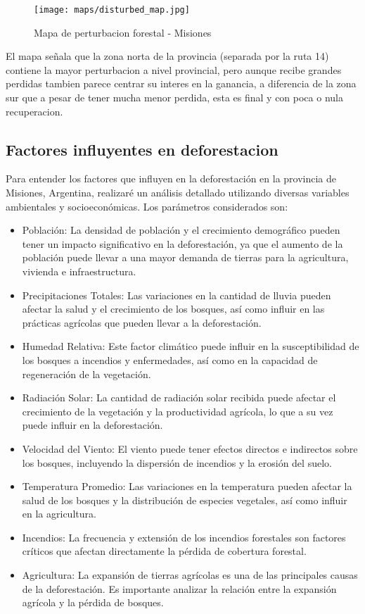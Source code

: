 \documentclass[11pt]{article}
\begin{document}
\begin{figure}[H]
    \centering
        \centering
        \texttt{[image: maps/disturbed\_map.jpg]}
        \caption{Mapa de perturbacion forestal - Misiones}
        \label{fig:smog_rating_año}
\end{figure}

El mapa señala que la zona norta de la provincia (separada por la ruta 14) contiene la mayor perturbacion a nivel provincial, pero aunque recibe grandes perdidas tambien parece centrar su interes en la ganancia, a diferencia de la zona sur que a pesar de tener mucha menor perdida, esta es final y con poca o nula recuperacion.


\subsection{Factores influyentes en deforestacion } \label{tab: Analisis 2}
Para entender los factores que influyen en la deforestación en la provincia de Misiones, Argentina, realizaré un análisis detallado utilizando diversas variables ambientales y socioeconómicas. Los parámetros considerados son:

    \begin{itemize}
        \item Población: La densidad de población y el crecimiento demográfico pueden tener un impacto significativo en la deforestación, ya que el aumento de la población puede llevar a una mayor demanda de tierras para la agricultura, vivienda e infraestructura.
        \item Precipitaciones Totales: Las variaciones en la cantidad de lluvia pueden afectar la salud y el crecimiento de los bosques, así como influir en las prácticas agrícolas que pueden llevar a la deforestación.
        \item Humedad Relativa: Este factor climático puede influir en la susceptibilidad de los bosques a incendios y enfermedades, así como en la capacidad de regeneración de la vegetación.
        \item Radiación Solar: La cantidad de radiación solar recibida puede afectar el crecimiento de la vegetación y la productividad agrícola, lo que a su vez puede influir en la deforestación.
        \item Velocidad del Viento: El viento puede tener efectos directos e indirectos sobre los bosques, incluyendo la dispersión de incendios y la erosión del suelo.
        \item Temperatura Promedio: Las variaciones en la temperatura pueden afectar la salud de los bosques y la distribución de especies vegetales, así como influir en la agricultura.
        \item Incendios: La frecuencia y extensión de los incendios forestales son factores críticos que afectan directamente la pérdida de cobertura forestal.
        \item Agricultura: La expansión de tierras agrícolas es una de las principales causas de la deforestación. Es importante analizar la relación entre la expansión agrícola y la pérdida de bosques.
    \end{itemize}
\end{document}
